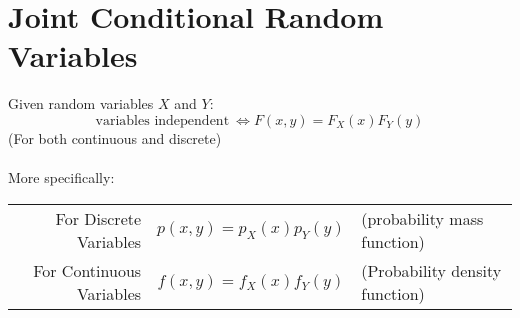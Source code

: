\documentclass{report}
\begin{document}
\section*{Joint Conditional Random Variables}
Given random variables $X$ and $Y$:
\[\text{variables independent} \ \Leftrightarrow F(x,y) = F_X(x)F_Y(y)\]
(For both continuous and discrete)
\\
\\ More specifically:
\begin{center}
	\begin{tabular}{r c l}
		For Discrete Variables   & $p(x,y) = p_X(x)p_Y(y)$ & (probability mass function)    \\
		For Continuous Variables & $f(x,y) = f_X(x)f_Y(y)$ & (Probability density function) \\
	\end{tabular}
\end{center}
\end{document}

